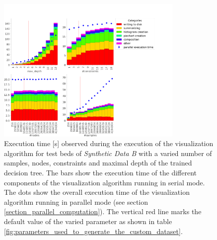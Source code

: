 \begin{figure}
    \centering
    \includegraphics[width=0.8\textwidth,trim=0 0 80 70,clip]{images/evaluation/parallelVsSerialTime.png}
    \caption{Execution time [s] observed during the execution of the visualization algorithm for test beds of \textit{Synthetic Data B} with a varied number of samples, nodes, constraints and maximal depth of the trained decision tree. The bars show the execution time of the different components of the visualization algorithm running in serial mode. The dots show the overall execution time of the visualization algorithm running in parallel mode (see section \ref{section_parallel_computation}). The vertical red line marks the default value of the varied parameter as shown in table \ref{fig:parameters_used_to_generate_the_custom_dataset}.}
    \label{fig:parallelvsserial_eval}
\end{figure}

